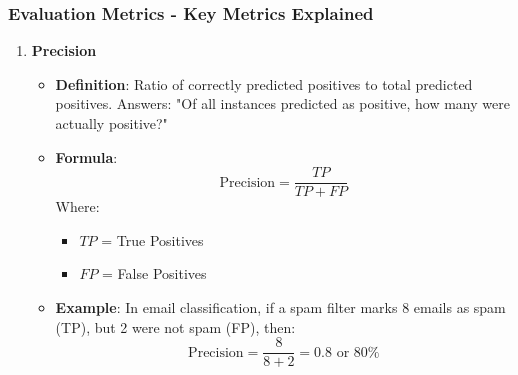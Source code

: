 \documentclass{beamer}
\begin{document}
\begin{frame}[fragile]
    \frametitle{Evaluation Metrics - Key Metrics Explained}
    \begin{enumerate}
        \item \textbf{Precision}
            \begin{itemize}
                \item \textbf{Definition}: Ratio of correctly predicted positives to total predicted positives. Answers: "Of all instances predicted as positive, how many were actually positive?"
                \item \textbf{Formula}:
                \begin{equation}
                    \text{Precision} = \frac{TP}{TP + FP}
                \end{equation}
                Where:
                \begin{itemize}
                    \item \(TP\) = True Positives
                    \item \(FP\) = False Positives
                \end{itemize}
                \item \textbf{Example}: 
                In email classification, if a spam filter marks 8 emails as spam (TP), but 2 were not spam (FP), then: 
                \begin{equation}
                    \text{Precision} = \frac{8}{8 + 2} = 0.8 \text{ or } 80\%
                \end{equation}
            \end{itemize}
    \end{enumerate}
\end{frame}
\end{document}

